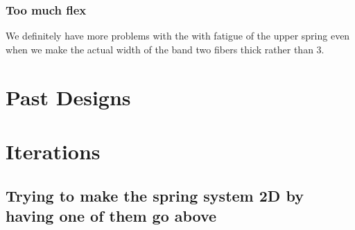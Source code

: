 \documentclass{article}
\begin{document}
\subsubsection{Too much flex}

We definitely have more problems with the with fatigue of the upper spring even when we make the actual width of the band two fibers thick rather than 3.

\section{Past Designs}

\section{Iterations}
\subsection{Trying to make the spring system 2D by having one of them go above}
\end{document}
